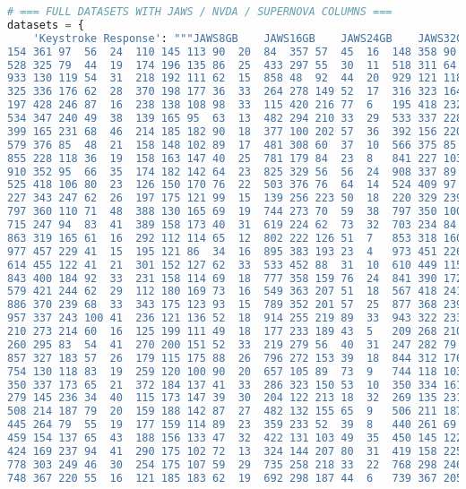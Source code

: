 \begin{lstlisting}[language=python]
# === FULL DATASETS WITH JAWS / NVDA / SUPERNOVA COLUMNS ===
datasets = {
    'Keystroke Response': """JAWS8GB	JAWS16GB	JAWS24GB	JAWS32GB	JAWS64GB	NVDA8GB	NVDA16GB	NVDA24GB	NVDA32GB	NVDA64GB	SUPERNOVA8GB	SUPERNOVA16GB	SUPERNOVA24GB	SUPERNOVA32GB	SUPERNOVA64GB	NARRATOR8GB	NARRATOR16GB	NARRATOR24GB	NARRATOR32GB	NARRATOR64GB
154	361	97	56	24	110	145	113	90	20	84	357	57	45	16	148	358	90	54	23
528	325	79	44	19	174	196	135	86	25	433	297	55	30	11	518	311	64	37	18
933	130	119	54	31	218	192	111	62	15	858	48	92	44	20	929	121	118	48	25
325	336	176	62	28	370	198	177	36	33	264	278	149	52	17	316	323	164	54	20
197	428	246	87	16	238	138	108	98	33	115	420	216	77	6	195	418	232	75	6
534	347	240	49	38	139	165	95	63	13	482	294	210	33	29	533	337	228	47	24
399	165	231	68	46	214	185	182	90	18	377	100	202	57	36	392	156	220	61	35
579	376	85	48	21	158	148	102	89	17	481	308	60	37	10	566	375	85	36	8
855	228	118	36	19	158	163	147	40	25	781	179	84	23	8	841	227	103	23	4
910	352	95	66	35	174	182	142	64	23	825	329	56	56	24	908	337	89	59	29
525	418	106	80	23	126	150	170	76	22	503	376	76	64	14	524	409	97	75	17
227	343	247	62	26	197	175	121	99	15	139	256	223	50	18	220	329	239	53	17
797	360	110	71	48	388	130	165	69	19	744	273	70	59	38	797	350	100	66	42
715	247	94	83	41	389	158	173	40	31	619	224	62	73	32	703	234	84	82	35
863	319	165	61	16	292	112	114	65	12	802	222	126	51	7	853	318	160	52	8
977	457	229	41	15	195	121	86	34	16	895	383	193	23	4	973	451	226	38	12
614	455	122	41	21	301	152	127	62	33	533	452	88	31	10	610	449	115	39	6
843	400	184	92	33	231	158	114	69	18	777	358	159	76	24	841	390	172	91	22
579	421	244	62	29	112	180	169	73	16	549	363	207	51	18	567	418	241	49	21
886	370	239	68	33	343	175	123	93	15	789	352	201	57	25	877	368	239	63	32
957	337	243	100	41	236	121	136	52	18	914	255	219	89	33	943	322	233	85	29
210	273	214	60	16	125	199	111	49	18	177	233	189	43	5	209	268	210	57	9
260	295	83	54	41	270	200	151	52	33	219	279	56	40	31	247	282	79	44	33
857	327	183	57	26	179	115	175	88	26	796	272	153	39	18	844	312	176	57	11
754	130	118	83	19	259	120	100	90	20	657	105	89	73	9	744	118	103	69	6
350	337	173	65	21	372	184	137	41	33	286	323	150	53	10	350	334	161	53	17
279	145	236	34	40	115	173	147	39	30	204	122	213	18	32	269	135	231	22	33
508	214	187	79	20	159	188	142	87	27	482	132	155	65	9	506	211	187	74	5
445	264	79	55	19	177	159	114	89	23	359	233	52	39	8	440	261	69	46	13
459	154	137	65	43	188	156	133	47	32	422	131	103	49	35	450	145	122	51	40
424	169	237	94	41	290	175	102	72	13	324	144	207	80	31	419	158	225	89	35
778	303	249	46	30	254	175	107	59	29	735	258	218	33	22	768	298	246	39	18
748	367	220	55	16	121	185	183	62	19	692	298	187	44	6	739	367	205	40	16

\end{lstlisting}
